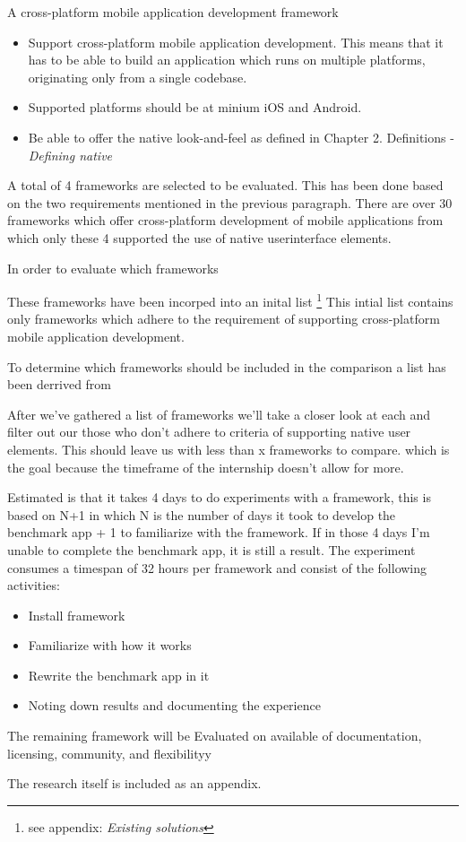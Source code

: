A cross-platform mobile application development framework
\begin{itemize}
\item Support cross-platform mobile application development. This means that it has to be able to build an application which runs on multiple platforms, originating only from a single codebase.
\item Supported platforms should be at minium iOS and Android. 
\item Be able to offer the native look-and-feel as defined in Chapter  2. Definitions -  \emph{Defining native}
\end{itemize}



A total of 4 frameworks are selected to be evaluated. This has been done based on the two requirements mentioned in the previous paragraph. There are over 30 frameworks which offer cross-platform development of mobile applications\cite{Wikipedia2012} from which only these 4 supported the use of native userinterface elements.



In order to evaluate which frameworks 

These frameworks have been incorped into an inital list \footnote{see appendix: \emph{Existing solutions}} This intial list contains only frameworks which adhere to the requirement of supporting cross-platform mobile application development.

To determine which frameworks should be included in the comparison a list has been derrived from 



After we've gathered a list of frameworks we'll take a closer look at each and filter out our those who don't adhere to criteria of supporting native user elements. This should leave us with less than x frameworks to compare. which is the goal because the timeframe of the internship doesn't allow for more. 


Estimated is that it takes 4 days to do experiments with a framework, this is based on N+1 in which N is the number of days it took to develop the benchmark app + 1 to familiarize with the framework. If in those 4 days I'm unable to complete the benchmark app, it is still a result. The experiment consumes a timespan of 32 hours per framework and consist of the following activities:

\begin{itemize}
	\item Install framework
	\item Familiarize with how it works
	\item Rewrite the benchmark app in it
	\item Noting down results and documenting the experience
\end{itemize}

The remaining framework will be Evaluated on available of documentation, licensing, community, and flexibilityy

The research itself is included as an appendix.

